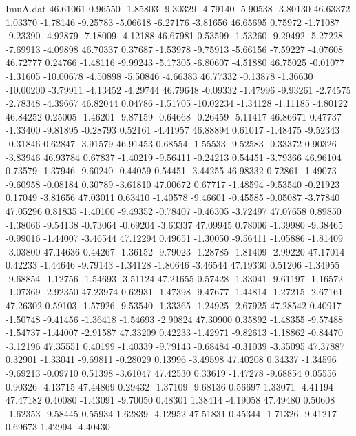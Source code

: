 \begin{filecontents}{ImuA.dat}
  46.61061    0.96550   -1.85803   -9.30329   -4.79140   -5.90538   -3.80130
  46.63372    1.03370   -1.78146   -9.25783   -5.06618   -6.27176   -3.81656
  46.65695    0.75972   -1.71087   -9.23390   -4.92879   -7.18009   -4.12188
  46.67981    0.53599   -1.53260   -9.29492   -5.27228   -7.69913   -4.09898
  46.70337    0.37687   -1.53978   -9.75913   -5.66156   -7.59227   -4.07608
  46.72777    0.24766   -1.48116   -9.99243   -5.17305   -6.80607   -4.51880
  46.75025   -0.01077   -1.31605  -10.00678   -4.50898   -5.50846   -4.66383
  46.77332   -0.13878   -1.36630  -10.00200   -3.79911   -4.13452   -4.29744
  46.79648   -0.09332   -1.47996   -9.93261   -2.74575   -2.78348   -4.39667
  46.82044    0.04786   -1.51705  -10.02234   -1.34128   -1.11185   -4.80122
  46.84252    0.25005   -1.46201   -9.87159   -0.64668   -0.26459   -5.11417
  46.86671    0.47737   -1.33400   -9.81895   -0.28793    0.52161   -4.41957
  46.88894    0.61017   -1.48475   -9.52343   -0.31846    0.62847   -3.91579
  46.91453    0.68554   -1.55533   -9.52583   -0.33372    0.90326   -3.83946
  46.93784    0.67837   -1.40219   -9.56411   -0.24213    0.54451   -3.79366
  46.96104    0.73579   -1.37946   -9.60240   -0.44059    0.54451   -3.44255
  46.98332    0.72861   -1.49073   -9.60958   -0.08184    0.30789   -3.61810
  47.00672    0.67717   -1.48594   -9.53540   -0.21923    0.17049   -3.81656
  47.03011    0.63410   -1.40578   -9.46601   -0.45585   -0.05087   -3.77840
  47.05296    0.81835   -1.40100   -9.49352   -0.78407   -0.46305   -3.72497
  47.07658    0.89850   -1.38066   -9.54138   -0.73064   -0.69204   -3.63337
  47.09945    0.78006   -1.39980   -9.38465   -0.99016   -1.44007   -3.46544
  47.12294    0.49651   -1.30050   -9.56411   -1.05886   -1.81409   -3.03800
  47.14636    0.44267   -1.36152   -9.79023   -1.28785   -1.81409   -2.99220
  47.17014    0.42233   -1.44646   -9.79143   -1.34128   -1.80646   -3.46544
  47.19330    0.51206   -1.34955   -9.68854   -1.12756   -1.54693   -3.51124
  47.21655    0.57428   -1.33041   -9.61197   -1.16572   -1.07369   -2.92350
  47.23974    0.62931   -1.47398   -9.47677   -1.44814   -1.27215   -2.67161
  47.26302    0.59103   -1.57926   -9.53540   -1.33365   -1.24925   -2.67925
  47.28542    0.40917   -1.50748   -9.41456   -1.36418   -1.54693   -2.90824
  47.30900    0.35892   -1.48355   -9.57488   -1.54737   -1.44007   -2.91587
  47.33209    0.42233   -1.42971   -9.82613   -1.18862   -0.84470   -3.12196
  47.35551    0.40199   -1.40339   -9.79143   -0.68484   -0.31039   -3.35095
  47.37887    0.32901   -1.33041   -9.69811   -0.28029    0.13996   -3.49598
  47.40208    0.34337   -1.34596   -9.69213   -0.09710    0.51398   -3.61047
  47.42530    0.33619   -1.47278   -9.68854    0.05556    0.90326   -4.13715
  47.44869    0.29432   -1.37109   -9.68136    0.56697    1.33071   -4.41194
  47.47182    0.40080   -1.43091   -9.70050    0.48301    1.38414   -4.19058
  47.49480    0.50608   -1.62353   -9.58445    0.55934    1.62839   -4.12952
  47.51831    0.45344   -1.71326   -9.41217    0.69673    1.42994   -4.40430
\end{filecontents}
